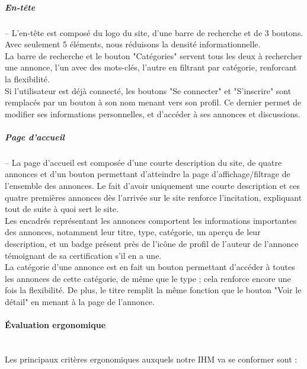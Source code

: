 \documentclass[a4paper,11pt]{article}
\begin{document}
\pagebreak

\subparagraph{En-tête}
--  L'en-tête est composé du logo du site, d'une barre de recherche et de 3 boutons.
Avec seulement 5 éléments, nous réduisons la densité informationnelle.\\
La barre de recherche et le bouton "Catégories" servent tous les deux à rechercher une
annonce, l'un avec des mots-clés, l'autre en filtrant par catégorie, renforcant
la flexibilité.\\


Si l'utilisateur est déjà connecté, les boutons "Se connecter" et "S'inscrire"
sont remplacés par un bouton à son nom menant vers son profil.
Ce dernier permet de modifier ses informations personnelles, et d'accéder à ses annonces et discussions.\\

\subparagraph{Page d'accueil}
 --  La page d'accueil est composée d'une courte description du site, de quatre annonces et
d'un bouton permettant d'atteindre la page d'affichage/filtrage de l'ensemble des annonces.
Le fait d'avoir uniquement une courte description et ces quatre premières annonces
dès l'arrivée sur le site renforce l'incitation, expliquant tout de suite à quoi sert
le site.\\

Les encadrés représentant les annonces comportent les informations importantes des
annonces, notamment leur titre, type, catégorie, un aperçu de leur description,
et un badge présent près de l'icône de profil de l'auteur de l'annonce témoignant de
sa certification s'il en a une.\\
La catégorie d'une annonce est en fait un bouton permettant d'accéder à toutes les annonces de cette catégorie, de même que le type ; cela renforce encore une fois la flexibilité. De plus, le titre remplit la même fonction que le bouton "Voir le détail" en menant à la page de l'annonce.\\

\paragraph{Évaluation ergonomique}\mbox{} \\

Les principaux critères ergonomiques auxquels notre IHM va se conformer sont :\\
\end{document}
